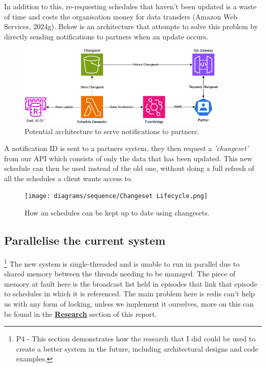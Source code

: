 In addition to this, re-requesting schedules that haven't been updated is a waste of time and costs the organisation money for data 
transfers (Amazon Web Services, 2024g). Below is an architecture that attempts to solve this problem by directly sending notifications to 
partners when an update occurs.

\begin{figure}[H]
  \centering
  \includegraphics[width=10cm]{assets/architectures/changesets.drawio.png}
  \caption{Potential architecture to serve notifications to partners.}
  \label{fig:changsetArchitecture}
\end{figure}

A notification ID is sent to a partners system, they then request a \textit{'changeset'} from our API which consists of only the data that has been updated.
This new schedule can then be used instead of the old one, without doing a full refresh of all the schedules a client wants access to.

\begin{figure}[H]
  \centering
  \texttt{[image: diagrams/sequence/Changeset Lifecycle.png]}
  \caption{How an schedules can be kept up to date using changesets.}
  \label{fig:changsetLifecycle}
\end{figure}

\newpage
\subsection{Parallelise the current system}
\label{sec:dynamo}
\footnote{P4 - This section demonstrates how the research that I did could be used to create a better system in the future, including architectural designs 
and code examples.}
The new system is single-threaded and is unable to run in parallel due to shared memory between the threads needing to be managed. The piece of memory
at fault here is the broadcast list held in episodes that link that episode to schedules in which it is referenced. The main problem here is redis 
can't help us with any form of locking, unless we implement it ourselves, more on this can be found in the \hyperref[sec:storageSolutions]{\textbf{Research}}
section of this report.

